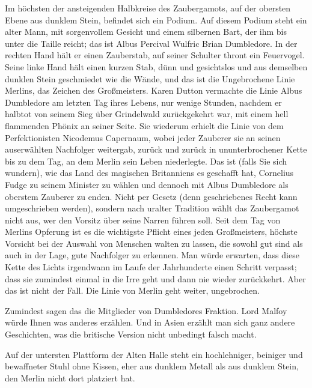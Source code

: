Im höchsten der ansteigenden Halbkreise des Zaubergamots, auf der obersten Ebene aus dunklem Stein, befindet sich ein Podium. Auf diesem Podium steht ein alter Mann, mit sorgenvollem Gesicht und einem silbernen Bart, der ihm bis unter die Taille reicht; das ist Albus Percival Wulfric Brian Dumbledore. In der rechten Hand hält er einen Zauberstab, auf seiner Schulter thront ein Feuervogel. Seine linke Hand hält einen kurzen Stab, dünn und gesichtslos und aus demselben dunklen Stein geschmiedet wie die Wände, und das ist die Ungebrochene Linie Merlins, das Zeichen des Großmeisters. Karen Dutton vermachte die Linie Albus Dumbledore am letzten Tag ihres Lebens, nur wenige Stunden, nachdem er halbtot von seinem Sieg über Grindelwald zurückgekehrt war, mit einem hell flammenden Phönix an seiner Seite. Sie wiederum erhielt die Linie von dem Perfektionisten Nicodemus Capernaum, wobei jeder Zauberer sie an seinen auserwählten Nachfolger weitergab, zurück und zurück in ununterbrochener Kette bis zu dem Tag, an dem Merlin sein Leben niederlegte. Das ist (falls Sie sich wundern), wie das Land des magischen Britanniens es geschafft hat, Cornelius Fudge zu seinem Minister zu wählen und dennoch mit Albus Dumbledore als oberstem Zauberer zu enden. Nicht per Gesetz (denn geschriebenes Recht kann umgeschrieben werden), sondern nach uralter Tradition wählt das Zaubergamot nicht aus, wer den Vorsitz über seine Narren führen soll. Seit dem Tag von Merlins Opferung ist es die wichtigste Pflicht eines jeden Großmeisters, höchste Vorsicht bei der Auswahl von Menschen walten zu lassen, die sowohl gut sind als auch in der Lage, gute Nachfolger zu erkennen. Man würde erwarten, dass diese Kette des Lichts irgendwann im Laufe der Jahrhunderte einen Schritt verpasst; dass sie zumindest einmal in die Irre geht und dann nie wieder zurückkehrt. Aber das ist nicht der Fall. Die Linie von Merlin geht weiter, ungebrochen.

Zumindest sagen das die Mitglieder von Dumbledores Fraktion. Lord Malfoy würde Ihnen was anderes erzählen. Und in Asien erzählt man sich ganz andere Geschichten, was die britische Version nicht unbedingt falsch macht.

Auf der untersten Plattform der Alten Halle steht ein hochlehniger, beiniger und bewaffneter Stuhl ohne Kissen, eher aus dunklem Metall als aus dunklem Stein, den Merlin nicht dort platziert hat.

